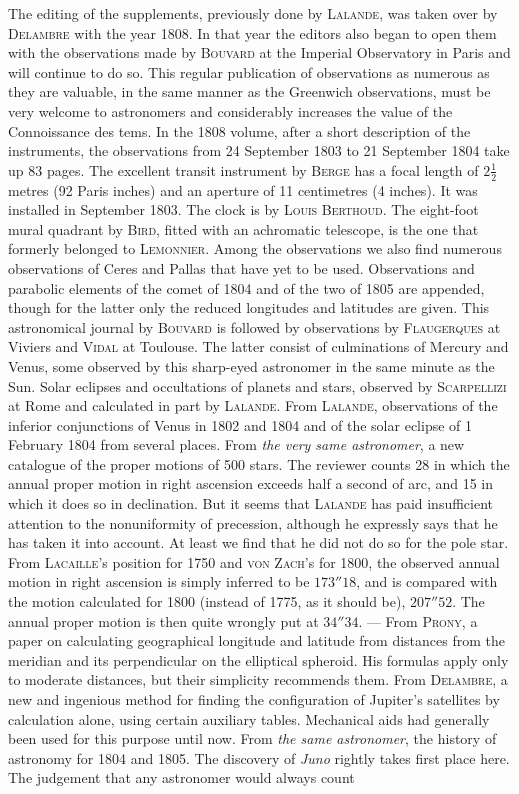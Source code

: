 The editing of the supplements, previously done by \textsc{Lalande}, was taken over by \textsc{Delambre} with the year 1808. In that year the editors also began to open them with the observations made by \textsc{Bouvard} at the Imperial Observatory in Paris and will continue to do so. This regular publication of observations as numerous as they are valuable, in the same manner as the Greenwich observations, must be very welcome to astronomers and considerably increases the value of the Connoissance des tems. In the 1808 volume, after a short description of the instruments, the observations from 24 September 1803 to 21 September 1804 take up 83 pages. The excellent transit instrument by \textsc{Berge} has a focal length of $2\frac{1}{2}$ metres (92 Paris inches) and an aperture of 11 centimetres (4 inches). It was installed in September 1803. The clock is by \textsc{Louis Berthoud}. The eight-foot mural quadrant by \textsc{Bird}, fitted with an achromatic telescope, is the one that formerly belonged to \textsc{Lemonnier}. Among the observations we also find numerous observations of Ceres and Pallas that have yet to be used. Observations and parabolic elements of the comet of 1804 and of the two of 1805 are appended, though for the latter only the reduced longitudes and latitudes are given. This astronomical journal by \textsc{Bouvard} is followed by observations by \textsc{Flaugerques} at Viviers and \textsc{Vidal} at Toulouse. The latter consist of culminations of Mercury and Venus, some observed by this sharp-eyed astronomer in the same minute as the Sun. Solar eclipses and occultations of planets and stars, observed by \textsc{Scarpellizi} at Rome and calculated in part by \textsc{Lalande}. From \textsc{Lalande}, observations of the inferior conjunctions of Venus in 1802 and 1804 and of the solar eclipse of 1 February 1804 from several places. From \emph{the very same astronomer}, a new catalogue of the proper motions of 500 stars. The reviewer counts 28 in which the annual proper motion in right ascension exceeds half a second of arc, and 15 in which it does so in declination. But it seems that \textsc{Lalande} has paid insufficient attention to the nonuniformity of precession, although he expressly says that he has taken it into account. At least we find that he did not do so for the pole star. From \textsc{Lacaille}’s position for 1750 and \textsc{von Zach}’s for 1800, the observed annual motion in right ascension is simply inferred to be $173''18$, and is compared with the motion calculated for 1800 (instead of 1775, as it should be), $207''52$. The annual proper motion is then quite wrongly put at $34''34$. --- From \textsc{Prony}, a paper on calculating geographical longitude and latitude from distances from the meridian and its perpendicular on the elliptical spheroid. His formulas apply only to moderate distances, but their simplicity recommends them. From \textsc{Delambre}, a new and ingenious method for finding the configuration of Jupiter’s satellites by calculation alone, using certain auxiliary tables. Mechanical aids had generally been used for this purpose until now. From \emph{the same astronomer}, the history of astronomy for 1804 and 1805. The discovery of \emph{Juno} rightly takes first place here. The judgement that any astronomer would always count 
